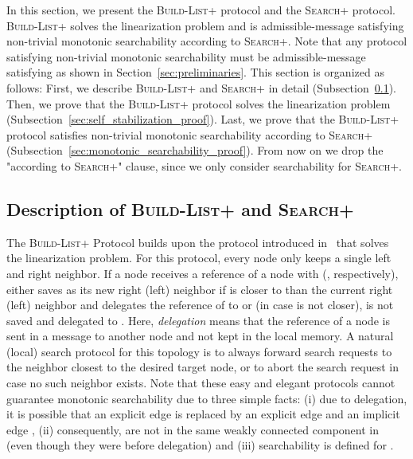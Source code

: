 \documentclass[a4paper,USenglish]{lipics}
\newcommand{\blp}{\textsc{Build-List+}\xspace}
\newcommand{\srp}{\textsc{Search+}\xspace}
\newcommand{\srpwithoutxspace}{\textsc{Search+}}
\begin{document}
In this section, we present the \blp protocol and the \srp protocol. \blp solves the linearization problem and is admissible-message satisfying non-trivial monotonic searchability according to \srp.
Note that any protocol satisfying non-trivial monotonic searchability must be admissible-message satisfying as shown in Section~\ref{sec:preliminaries}.
This section is organized as follows: 
First, we describe \blp and \srp in detail (Subsection~\ref{subsec:blp_desription}).
Then, we prove that the \blp protocol solves the linearization problem (Subsection~\ref{sec:self_stabilization_proof}).
Last, we prove that the \blp protocol satisfies non-trivial monotonic searchability according to \srp (Subsection~\ref{sec:monotonic_searchability_proof}).
From now on we drop the "according to \srpwithoutxspace" clause, since we only consider searchability for \srp.

\subsection{Description of \blp and \srp}
\label{subsec:blp_desription}
The \blp Protocol builds upon the protocol introduced in~\cite{self-stabilizing-list} that solves the linearization problem.
For this protocol, every node only keeps a single left and right neighbor. 
If a node  receives a reference of a node  with  (, respectively),  either saves  as its new right (left) neighbor if  is closer to  than the current right (left) neighbor  and delegates the reference of  to  or (in case  is not closer),  is not saved and delegated to .
Here, \emph{delegation} means that the reference of a node is sent in a message to another node and not kept in the local memory.
A natural (local) search protocol for this topology is to always forward search requests to the neighbor closest to the desired target node, or to abort the search request in case no such neighbor exists.
Note that these easy and elegant protocols cannot guarantee monotonic searchability due to three simple facts: (i) due to delegation, it is possible that an explicit edge  is replaced by an explicit edge  and an implicit edge , (ii) consequently,  are not in the same weakly connected component in  (even though they were before delegation) and (iii) searchability is defined for .
\end{document}
